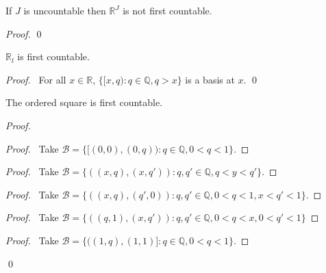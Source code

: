 \begin{lm}[CC]
  If $J$ is uncountable then $\mathbb{R}^J$ is not first countable.
\end{lm}

\begin{proof}
  \pf
  \qed
\end{proof}

\begin{lm}
  $\mathbb{R}_l$ is first countable.
\end{lm}

\begin{proof}
  \pf\ For all $x \in \mathbb{R}$, $\{ [x, q) : q \in \mathbb{Q}, q > x \}$
  is a basis at $x$. \qed
\end{proof}

\begin{lm}
  The ordered square is first countable.
\end{lm}

\begin{proof}
  \pf
  \begin{proof}
    \pf\ Take $\mathcal{B} = \{ [(0, 0), (0, q)) : q \in \mathbb{Q}, 0 < q <
    1
    \}$.
  \end{proof}
  \begin{proof}
    \pf\ Take $\mathcal{B} = \{ ((x, q), (x, q')) : q, q' \in \mathbb{Q}, q <
    y < q' \}$.
  \end{proof}
  \begin{proof}
    \pf\ Take $\mathcal{B} = \{ ((x, q), (q', 0)) : q, q' \in \mathbb{Q}, 0 <
    q < 1, x < q' < 1 \}$.
  \end{proof}
  \begin{proof}
    \pf\ Take $\mathcal{B} = \{ ((q, 1), (x, q')) : q, q' \in \mathbb{Q}, 0 <
    q < x, 0 < q' < 1 \}$
  \end{proof}
  \begin{proof}
    \pf\ Take $\mathcal{B} = \{ ((1, q), (1, 1)] : q \in \mathbb{Q}, 0 < q <
    1
    \}$.
  \end{proof}
  \qed
\end{proof}

